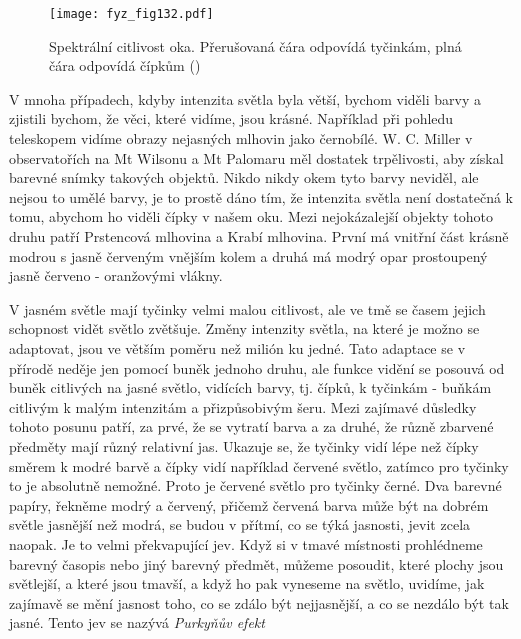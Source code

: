     \begin{figure}[ht!]  %
      \centering
      \texttt{[image: fyz\_fig132.pdf]}
      \caption{Spektrální citlivost oka. Přerušovaná čára odpovídá tyčinkám, plná čára odpovídá 
               čípkům
               (\cite[s.~470]{Feynman01})}
      \label{fyz:fig132}
    \end{figure}
    V mnoha případech, kdyby intenzita světla byla větší, bychom viděli barvy a zjistili bychom, že 
    věci, které vidíme, jsou krásné. Například při pohledu teleskopem vidíme obrazy nejasných 
    mlhovin jako černobílé. W. C. Miller v observatořích na Mt Wilsonu a Mt Palomaru měl dostatek 
    trpělivosti, aby získal barevné snímky takových objektů. Nikdo nikdy okem tyto barvy neviděl, 
    ale nejsou to umělé barvy, je to prostě dáno tím, že intenzita světla není dostatečná k tomu, 
    abychom ho viděli čípky v našem oku. Mezi nejokázalejší objekty tohoto druhu patří Prstencová 
    mlhovina a Krabí mlhovina. První má vnitřní část krásně modrou s jasně červeným vnějším kolem a 
    druhá má modrý opar prostoupený jasně červeno - oranžovými vlákny.
    
    V jasném světle mají tyčinky velmi malou citlivost, ale ve tmě se časem jejich schopnost vidět 
    světlo zvětšuje. Změny intenzity světla, na které je možno se adaptovat, jsou ve větším poměru 
    než milión ku jedné. Tato adaptace se v přírodě neděje jen pomocí buněk jednoho druhu, ale 
    funkce vidění se posouvá od buněk citlivých na jasné světlo, vidících barvy, tj. čípků, k 
    tyčinkám - buňkám citlivým k malým intenzitám a přizpůsobivým šeru. Mezi zajímavé důsledky 
    tohoto posunu patří, za prvé, že se vytratí barva a za druhé, že různě zbarvené předměty mají 
    různý relativní jas. Ukazuje se, že tyčinky vidí lépe než čípky směrem k modré barvě a čípky 
    vidí například červené světlo, zatímco pro tyčinky to je absolutně nemožné. Proto je červené 
    světlo pro tyčinky černé. Dva barevné papíry, řekněme modrý a červený, přičemž červená barva 
    může být na dobrém světle jasnější než modrá, se budou v přítmí, co se týká jasnosti, jevit 
    zcela naopak. Je to velmi překvapující jev. Když si v tmavé místnosti prohlédneme barevný 
    časopis nebo jiný barevný předmět, můžeme posoudit, které plochy jsou světlejší, a které jsou 
    tmavší, a když ho pak vyneseme na světlo, uvidíme, jak zajímavě se mění jasnost toho, co se 
    zdálo být nejjasnější, a co se nezdálo být tak jasné. Tento jev se nazývá \emph{Purkyňův efekt}
    
